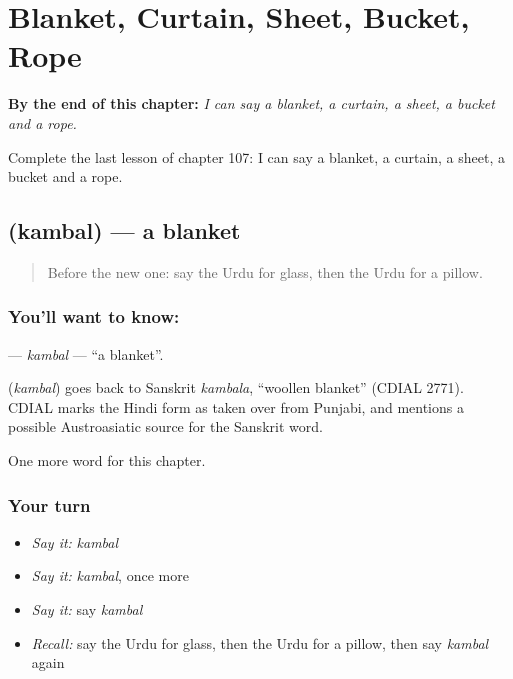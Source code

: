 
\chapter{Blanket, Curtain, Sheet, Bucket, Rope}
\label{ch:ur-blanket-curtain-sheet-bucket-rope}

\begin{chapteropening}
\textbf{By the end of this chapter:} \emph{I can say a blanket, a curtain, a sheet, a bucket and a rope.}

Complete the last lesson of chapter 107: I can say a blanket, a curtain, a sheet, a bucket and a rope.
\end{chapteropening}

\section[\texorpdfstring{\ur{کمبل} (kambal)}{کمبل (kambal)}]{ (kambal) — a blanket}

\label{lesson:UR-C107-kambal}



\begin{quote}
Before the new one: say the Urdu for glass, then the Urdu for a pillow.
\end{quote}

\subsection*{You'll want to know: }
\textbf{} — \emph{kambal} — \textquotedblleft{}a blanket\textquotedblright{}.

\begin{cousinweb}
\textbf{} (\emph{kambal}) goes back to Sanskrit \emph{kambala}, \textquotedblleft{}woollen blanket\textquotedblright{} (CDIAL 2771). CDIAL marks the Hindi form as taken over from Punjabi, and mentions a possible Austroasiatic source for the Sanskrit word.
\end{cousinweb}

\begin{grammarlens}[title={What you've built}]
One more word for this chapter.
\end{grammarlens}

\subsection*{Your turn}
\begin{itemize}
\raggedright
  \item \emph{Say it:} \emph{kambal}
  \item \emph{Say it:} \emph{kambal}, once more
  \item \emph{Say it:} say \emph{kambal}
  \item \emph{Recall:} say the Urdu for glass, then the Urdu for a pillow, then say \emph{kambal} again
\end{itemize}

